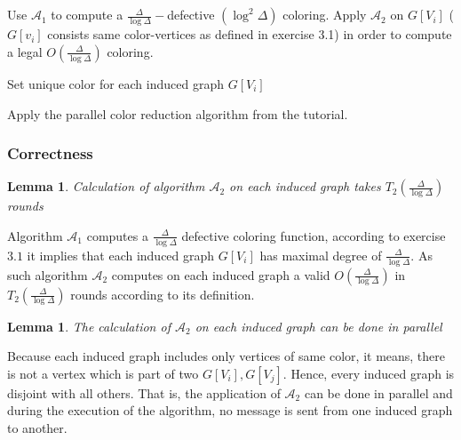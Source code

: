 \documentclass[11pt]{article}
\newtheorem{lemma}[theorem]{Lemma}
\begin{document}
\subsection{}

\begin{algorithmic}[1]
\State Use $\mathcal{A}_1$ to compute a $\frac{\Delta}{\log{\Delta}}-$defective $(\log^2{\Delta})$ coloring.
    \State Apply $\mathcal{A}_2$ on $G[V_i]$ ($G[v_i]$ consists same color-vertices as defined in exercise 3.1) in order to compute a legal $O(\frac{\Delta}{\log{\Delta}})$ coloring.
\EndFor

\State Set unique color for each induced graph $G[V_i]$


\State Apply the parallel color reduction algorithm from the tutorial.

\end{algorithmic}

\subsubsection*{Correctness}

\begin{lemma}
Calculation of algorithm $\mathcal{A}_2$ on each induced graph takes $T_2(\frac{\Delta}{\log{\Delta}})$ rounds
\end{lemma}
Algorithm $\mathcal{A}_1$ computes a $\frac{\Delta}{\log{\Delta}}$ defective coloring function, according to exercise $3.1$ it implies that each induced graph $G[V_i]$ has maximal degree of $\frac{\Delta}{\log{\Delta}}$. As such algorithm $\mathcal{A}_2$ computes on each induced graph a valid $O(\frac{\Delta}{\log{\Delta}})$ in $T_2(\frac{\Delta}{\log{\Delta}})$ rounds according to its definition.

\begin{lemma}
\label{A_2_parallel}
The calculation of $\mathcal{A}_2$ on each induced graph can be done in parallel
\end{lemma}
Because each induced graph includes only vertices of same color, it means, there is not a vertex which is part of two $G[V_i], G[V_j]$. Hence, every induced graph is disjoint with all others. That is, the application of $\mathcal{A}_2$ can be done in parallel and during the execution of the algorithm, no message is sent from one induced graph to another.
\end{document}
